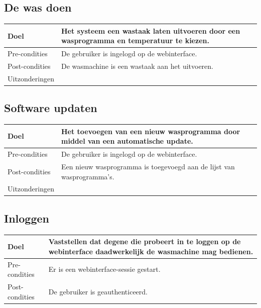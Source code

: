 \subsection{De was doen}
\begin{center}
  \begin{tabular}{ | p{4cm} | p{8.5cm} | }    \hline
    Doel & Het systeem een wastaak laten uitvoeren door een wasprogramma en temperatuur te kiezen. \\ \hline
    Pre-condities & De gebruiker is ingelogd op de webinterface. \\ \hline
    Post-condities & De wasmachine is een wastaak aan het uitvoeren. \\ \hline
    Uitzonderingen & \\
    \hline
  \end{tabular}
\end{center}

\subsection{Software updaten}
\begin{center}
  \begin{tabular}{ | p{4cm} | p{8.5cm} | }    \hline
    Doel & Het toevoegen van een nieuw wasprogramma door middel van een automatische update. \\ \hline
    Pre-condities & De gebruiker is ingelogd op de webinterface. \\ \hline
    Post-condities & Een nieuw wasprogramma is toegevoegd aan de lijst van wasprogramma's. \\ \hline
    Uitzonderingen & \\
    \hline
  \end{tabular}
\end{center}

\subsection{Inloggen}
\begin{center}
  \begin{tabular}{ | p{4cm} | p{8.5cm} | } \hline
  Doel & Vaststellen dat degene die probeert in te loggen op de webinterface daadwerkelijk de wasmachine mag bedienen. \\ \hline
  Pre-condities & Er is een webinterface-sessie gestart.\\ \hline
  Post-condities & De gebruiker is geauthenticeerd. \\ \hline
  \end{tabular}
\end{center}

